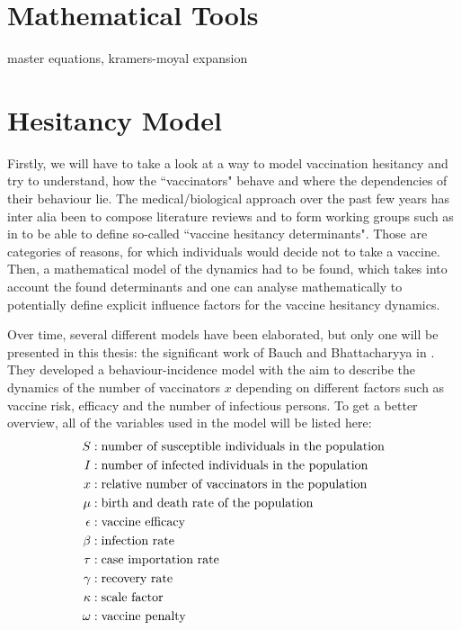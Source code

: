 \documentclass[12pt,a4paper,twoside]{article}
\begin{document}
\section{Mathematical Tools}
master equations, kramers-moyal expansion

\section{Hesitancy Model}
Firstly, we will have to take a look at a way to model vaccination hesitancy and try to understand, how the ``vaccinators" behave and where the dependencies of their behaviour lie. The medical/biological approach over the past few years has inter alia been to compose literature reviews and to form working groups such as in \cite{MacDonald2015} to be able to define so-called ``vaccine hesitancy determinants". Those are categories of reasons, for which individuals would decide not to take a vaccine. Then, a mathematical model of the dynamics had to be found, which takes into account the found determinants and one can analyse mathematically to potentially define explicit influence factors for the vaccine hesitancy dynamics. 

Over time, several different models have been elaborated, but only one will be presented in this thesis: the significant work of Bauch and Bhattacharyya in \cite{Bauch2012}. They developed a behaviour-incidence model with the aim to describe the dynamics of the number of vaccinators $x$ depending on different factors such as vaccine risk, efficacy and the number of infectious persons. To get a better overview, all of the variables used in the model will be listed here:
\begin{align}\label{table:bauch_model_variables}
\begin{split}
S &: \textnormal{number of susceptible individuals in the population}\\
I &: \textnormal{number of infected individuals in the population}\\
x &: \textnormal{relative number of vaccinators in the population}\\
\mu &: \textnormal{birth and death rate of the population}\\
\epsilon &: \textnormal{vaccine efficacy}\\
\beta &: \textnormal{infection rate}\\
\tau &: \textnormal{case importation rate}\\
\gamma &: \textnormal{recovery rate}\\
\kappa &: \textnormal{scale factor}\\
\omega &: \textnormal{vaccine penalty}
\end{split}
\end{align}
\end{document}
